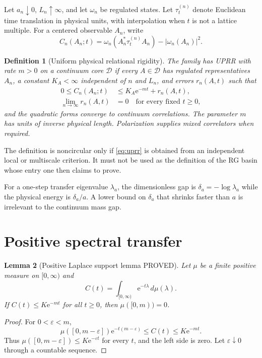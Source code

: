 \documentclass[11pt]{article}
\newcommand{\Pstatus}{\textcolor{proved}{\textsf{PROVED}}}
\newcommand{\e}{\mathrm e}
\newtheorem{definition}{Definition}[section]
\newtheorem{lemma}[definition]{Lemma}
\theoremstyle{remark}
\begin{document}
Let $a_n\downarrow0$, $L_n\uparrow\infty$, and let $\omega_n$ be regulated
states.  Let $\tau_t^{(n)}$ denote Euclidean time translation in physical
units, with interpolation when $t$ is not a lattice multiple.  For a centered
observable $A_n$, write
\[
 C_n(A_n;t)=\omega_n(A_n^*\tau_t^{(n)}A_n)
            -|\omega_n(A_n)|^2.
\]

\begin{definition}[Uniform physical relational rigidity]
The family has UPRR with rate $m>0$ on a continuum core $\mathcal D$ if every
$A\in\mathcal D$ has regulated representatives $A_n$, a constant $K_A<\infty$
independent of $n$ and $L_n$, and errors $r_n(A,t)$ such that
\begin{align}
 0\le C_n(A_n;t)&\le K_A\e^{-mt}+r_n(A,t),\label{eq:uprr}\\
 \lim_{n\to\infty}r_n(A,t)&=0\quad\text{for every fixed }t\ge0,\nonumber
\end{align}
and the quadratic forms converge to continuum correlations.  The parameter
$m$ has units of inverse physical length.  Polarization supplies mixed
correlators when required.
\end{definition}

The definition is noncircular only if \eqref{eq:uprr} is obtained from an
independent local or multiscale criterion.  It must not be used as the
definition of the RG basin whose entry one then claims to prove.

For a one-step transfer eigenvalue $\lambda_a$, the dimensionless gap is
$\delta_a=-\log\lambda_a$ while the physical energy is $\delta_a/a$.  A lower
bound on $\delta_a$ that shrinks faster than $a$ is irrelevant to the continuum
mass gap.

\section{Positive spectral transfer}

\begin{lemma}[Positive Laplace support lemma \Pstatus]\label{lem:laplace}
Let $\mu$ be a finite positive measure on $[0,\infty)$ and
\[
 C(t)=\int_{[0,\infty)}\e^{-t\lambda}\,d\mu(\lambda).
\]
If $C(t)\le K\e^{-mt}$ for all $t\ge0$, then
$\mu([0,m))=0$.
\end{lemma}

\begin{proof}
For $0<\varepsilon<m$,
\[
 \mu([0,m-\varepsilon])\e^{-t(m-\varepsilon)}
 \le C(t)\le K\e^{-mt}.
\]
Thus $\mu([0,m-\varepsilon])\le K\e^{-\varepsilon t}$ for every
$t$, and the left side is zero.  Let $\varepsilon\downarrow0$ through a
countable sequence.
\end{proof}
\end{document}
